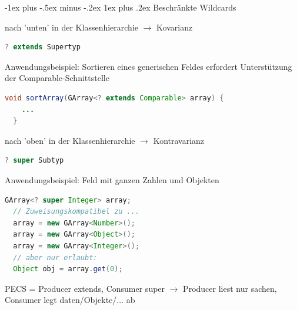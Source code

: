 \documentclass[10pt]{article}
\makeatletter
\renewcommand{\subsubsection}{\@startsection{subsubsection}{3}{0mm}%
                                {-1ex plus -.5ex minus -.2ex}%
                                {1ex plus .2ex}%
                                {\normalfont\small\bfseries}}
\makeatother
\begin{document}
\subsubsection{Beschränkte Wildcards}
\begin{itemize*}
  \item nach 'unten' in der Klassenhierarchie $\rightarrow$ Kovarianz
  \begin{lstlisting}[language=java] 
  ? extends Supertyp 
  \end{lstlisting}
  \item Anwendungsbeispiel: Sortieren eines generischen Feldes erfordert Unterstützung der Comparable-Schnittstelle
  \begin{lstlisting}[language=java]
  void sortArray(GArray<? extends Comparable> array) {
    ...
  }
  \end{lstlisting}
  \item nach 'oben' in der Klassenhierarchie $\rightarrow$ Kontravarianz
  \begin{lstlisting}[language=java]
  ? super Subtyp
  \end{lstlisting}
  \item Anwendungsbeispiel: Feld mit ganzen Zahlen und Objekten
  \begin{lstlisting}[language=java]
  GArray<? super Integer> array;
  // Zuweisungskompatibel zu ...
  array = new GArray<Number>();
  array = new GArray<Object>();
  array = new GArray<Integer>();
  // aber nur erlaubt:
  Object obj = array.get(0);
  \end{lstlisting}
\end{itemize*}

PECS = Producer extends, Consumer super $\rightarrow$ Producer liest nur sachen, Consumer legt daten/Objekte/... ab
\end{document}
